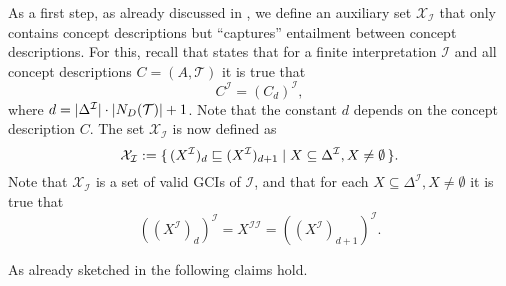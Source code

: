 As a first step, as already discussed in , we define an auxiliary
set $\mathcal{X}_{\mathcal{I}}$ that only contains \ELbot concept descriptions but
``captures'' entailment between \ELgfpbot concept descriptions.  For this, recall that
 states that for a finite interpretation $\mathcal{I}$ and all
\ELgfpbot concept descriptions $C = (A, \mathcal{T})$ it is true that
\begin{equation*}
  C^{\mathcal{I}} = (C_d)^{\mathcal{I}},
\end{equation*}
where $d = \lvert \Delta^{\mathcal{I}} \rvert \cdot \lvert N_D(\mathcal{T}) \rvert + 1$.  Note that
the constant $d$ depends on the concept description $C$.  The set
$\mathcal{X}_{\mathcal{I}}$ is now defined as
\begin{equation*}
  \mathcal{X}_{\mathcal{I}} := {\{\, (X^{\mathcal{I}})_d \sqsubseteq
    (X^{\mathcal{I}})_{d+1} \mid X \subseteq \Delta^{\mathcal{I}}, X \neq \emptyset \,\}}.
\end{equation*}
Note that $\mathcal{X}_{\mathcal{I}}$ is a set of valid GCIs of $\mathcal{I}$, and that
for each $X \subseteq \Delta^{\mathcal{I}}, X \neq \emptyset$ it is true that
\begin{equation*}
  ((X^{\mathcal{I}})_d)^{\mathcal{I}} = X^{\mathcal{I}\mathcal{I}} = ((X^{\mathcal{I}})_{d+1})^{\mathcal{I}}.
\end{equation*}

As already sketched in  the following claims hold.

